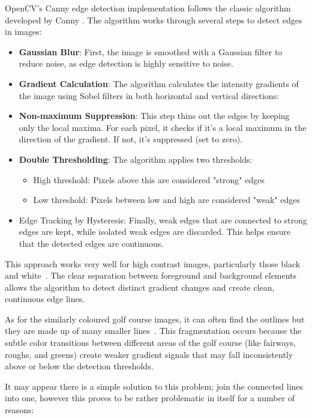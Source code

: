 \documentclass[final]{cmpreport_02}
\begin{document}
OpenCV's Canny edge detection implementation follows the classic algorithm developed by Canny \citep{canny1986computational}.
The algorithm works through several steps to detect edges in images:
\begin{itemize}
	\item \textbf{Gaussian Blur}: First, the image is smoothed with a Gaussian filter to reduce noise, as edge detection is highly sensitive to noise.
	\item \textbf{Gradient Calculation}: The algorithm calculates the intensity gradients of the image using Sobel filters in both horizontal and vertical directions:
	\item \textbf{Non-maximum Suppression}: This step thins out the edges by keeping only the local maxima. For each pixel, it checks if it's a local maximum in the direction of the gradient. If not, it's suppressed (set to zero).
	\item \textbf{Double Thresholding}: The algorithm applies two thresholds:
	      \begin{itemize}
		      \item High threshold: Pixels above this are considered "strong" edges
		      \item Low threshold: Pixels between low and high are considered "weak" edges
	      \end{itemize}
	\item Edge Tracking by Hysteresis: Finally, weak edges that are connected to strong edges are kept, while isolated weak edges are discarded. This helps ensure that the detected edges are continuous.
\end{itemize}
This approach works very well for high contrast images, particularly those black and white~. The clear separation between foreground and background elements allows the algorithm to detect distinct gradient changes and create clean, continuous edge lines.

As for the similarly coloured golf course images, it can often find the outlines but they are made up of many smaller lines~. This fragmentation occurs because the subtle color transitions between different areas of the golf course (like fairways, roughs, and greens) create weaker gradient signals that may fall inconsistently above or below the detection thresholds.

It may appear there is a simple solution to this problem; join the connected lines into one, however this proves to be rather problematic in itself for a number of reasons:
\end{document}
